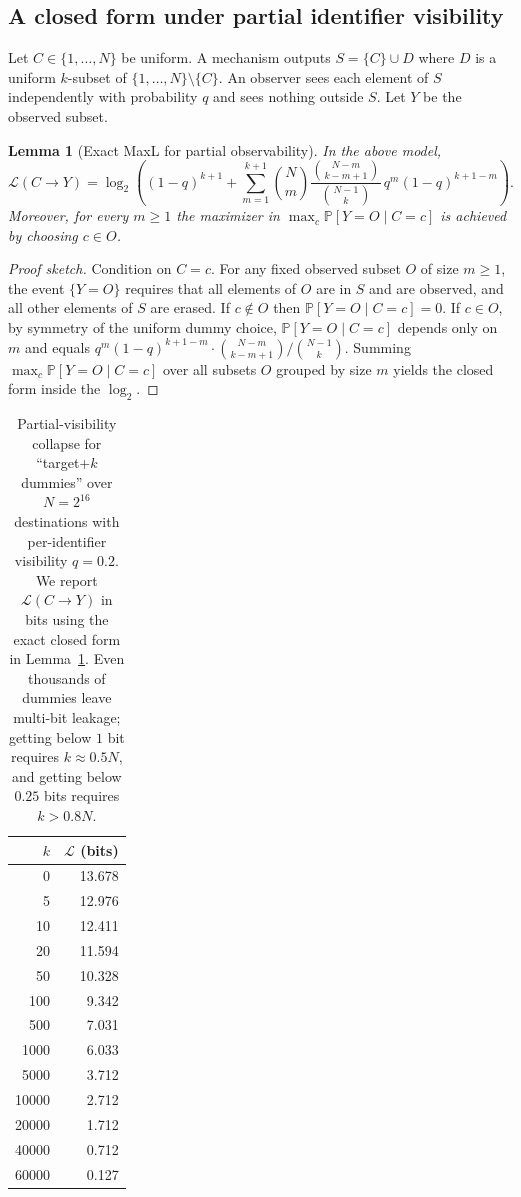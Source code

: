 \documentclass[11pt]{article}
\newcommand{\Prb}{\mathbb{P}}
\newcommand{\MaxL}{\mathcal{L}}
\newcommand{\logtwo}{\log_2}
\newtheorem{lemma}{Lemma}
\begin{document}
\subsection{A closed form under partial identifier visibility}
Let $C\in\{1,\dots,N\}$ be uniform.
A mechanism outputs $S=\{C\}\cup D$ where $D$ is a uniform $k$-subset of $\{1,\dots,N\}\setminus\{C\}$.
An observer sees each element of $S$ independently with probability $q$ and sees nothing outside $S$.
Let $Y$ be the observed subset.

\begin{lemma}[Exact MaxL for partial observability]\label{lem:kics-partial-obs}
In the above model,
\[
\MaxL(C\!\to\!Y)
= \logtwo\!\left(
(1-q)^{k+1} + \sum_{m=1}^{k+1} \binom{N}{m}\frac{\binom{N-m}{k-m+1}}{\binom{N-1}{k}}\, q^{m}(1-q)^{k+1-m}
\right).
\]
Moreover, for every $m\ge 1$ the maximizer in $\max_c \Prb[Y=O\mid C=c]$ is achieved by choosing $c\in O$.
\end{lemma}
\begin{proof}[Proof sketch]
Condition on $C=c$.
For any fixed observed subset $O$ of size $m\ge 1$, the event $\{Y=O\}$ requires that all elements of $O$ are in $S$ and are observed, and all other elements of $S$ are erased.
If $c\notin O$ then $\Prb[Y=O\mid C=c]=0$.
If $c\in O$, by symmetry of the uniform dummy choice, $\Prb[Y=O\mid C=c]$ depends only on $m$ and equals
$q^{m}(1-q)^{k+1-m}\cdot \binom{N-m}{k-m+1}/\binom{N-1}{k}$.
Summing $\max_c \Prb[Y=O\mid C=c]$ over all subsets $O$ grouped by size $m$ yields the closed form inside the $\logtwo$.
\end{proof}



\begin{table}[t]
\centering
\caption{Partial-visibility collapse for ``target+$k$ dummies'' over $N=2^{16}$ destinations with per-identifier visibility $q=0.2$. We report $\MaxL(C\!\to\!Y)$ in bits using the exact closed form in Lemma~\ref{lem:kics-partial-obs}. Even thousands of dummies leave multi-bit leakage; getting below $1$ bit requires $k\approx 0.5N$, and getting below $0.25$ bits requires $k>0.8N$.}
\label{tab:kics-collapse}
\begin{tabular}{r r}
\toprule
$k$ & $\MaxL$ (bits)\\
\midrule
0 & 13.678\\
5 & 12.976\\
10 & 12.411\\
20 & 11.594\\
50 & 10.328\\
100 & 9.342\\
500 & 7.031\\
1000 & 6.033\\
5000 & 3.712\\
10000 & 2.712\\
20000 & 1.712\\
40000 & 0.712\\
60000 & 0.127\\
\bottomrule
\end{tabular}
\end{table}
\end{document}
